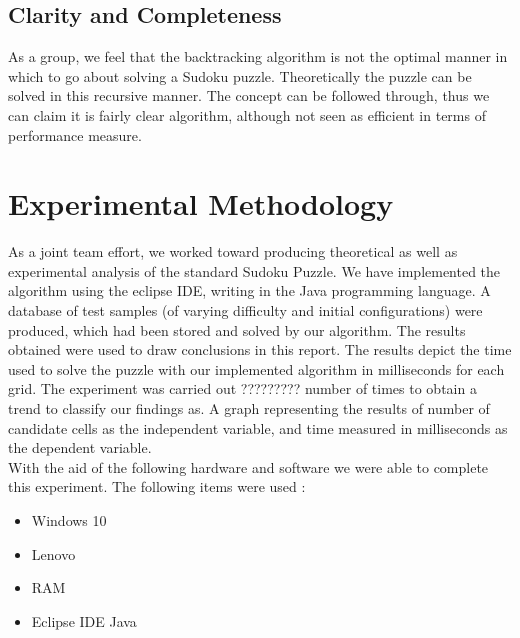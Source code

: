 \documentclass[12pt]{article}
\begin{document}
\subsection{Clarity and Completeness}
\begin{flushleft}
As a group, we feel that the backtracking algorithm is not the optimal manner in which to go about solving a Sudoku puzzle. Theoretically the puzzle can be solved in this recursive manner. The concept can be followed through, thus we can claim it is fairly clear algorithm, although not seen as efficient in terms of performance measure. 
\end{flushleft}

\section{Experimental Methodology}
As a joint team effort, we worked toward producing theoretical as well as experimental analysis of the standard Sudoku Puzzle. We have implemented the algorithm using the eclipse IDE, writing in the Java programming language. A database of test samples (of varying difficulty and initial configurations) were produced, which had been stored and solved by our algorithm. The results obtained were used to draw conclusions in this report. The results depict the time used to solve the puzzle with our implemented algorithm in milliseconds for each grid. The experiment was carried out ????????? number of times to obtain a trend to classify our findings as. A graph representing the results of number of candidate cells as the independent variable, and time measured in milliseconds as the dependent variable. \\
With the aid of the following hardware and software we were able to complete this experiment. The following items were used :
\begin{itemize}
\item Windows 10
\item Lenovo 
\item RAM
\item Eclipse IDE Java
\end{itemize}
\end{document}
